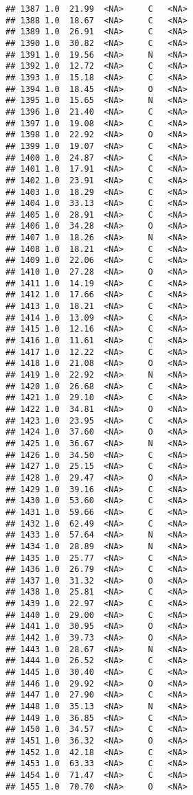 \documentclass[
]{article}
\begin{document}
\begin{verbatim}
## 1387 1.0  21.99  <NA>     C   <NA>
## 1388 1.0  18.67  <NA>     C   <NA>
## 1389 1.0  26.91  <NA>     C   <NA>
## 1390 1.0  30.82  <NA>     C   <NA>
## 1391 1.0  19.56  <NA>     N   <NA>
## 1392 1.0  12.72  <NA>     C   <NA>
## 1393 1.0  15.18  <NA>     C   <NA>
## 1394 1.0  18.45  <NA>     O   <NA>
## 1395 1.0  15.65  <NA>     N   <NA>
## 1396 1.0  21.40  <NA>     C   <NA>
## 1397 1.0  19.08  <NA>     C   <NA>
## 1398 1.0  22.92  <NA>     O   <NA>
## 1399 1.0  19.07  <NA>     C   <NA>
## 1400 1.0  24.87  <NA>     C   <NA>
## 1401 1.0  17.91  <NA>     C   <NA>
## 1402 1.0  23.91  <NA>     C   <NA>
## 1403 1.0  18.29  <NA>     C   <NA>
## 1404 1.0  33.13  <NA>     C   <NA>
## 1405 1.0  28.91  <NA>     C   <NA>
## 1406 1.0  34.28  <NA>     O   <NA>
## 1407 1.0  18.26  <NA>     N   <NA>
## 1408 1.0  18.21  <NA>     C   <NA>
## 1409 1.0  22.06  <NA>     C   <NA>
## 1410 1.0  27.28  <NA>     O   <NA>
## 1411 1.0  14.19  <NA>     C   <NA>
## 1412 1.0  17.66  <NA>     C   <NA>
## 1413 1.0  18.21  <NA>     C   <NA>
## 1414 1.0  13.09  <NA>     C   <NA>
## 1415 1.0  12.16  <NA>     C   <NA>
## 1416 1.0  11.61  <NA>     C   <NA>
## 1417 1.0  12.22  <NA>     C   <NA>
## 1418 1.0  21.08  <NA>     O   <NA>
## 1419 1.0  22.92  <NA>     N   <NA>
## 1420 1.0  26.68  <NA>     C   <NA>
## 1421 1.0  29.10  <NA>     C   <NA>
## 1422 1.0  34.81  <NA>     O   <NA>
## 1423 1.0  23.95  <NA>     C   <NA>
## 1424 1.0  37.60  <NA>     O   <NA>
## 1425 1.0  36.67  <NA>     N   <NA>
## 1426 1.0  34.50  <NA>     C   <NA>
## 1427 1.0  25.15  <NA>     C   <NA>
## 1428 1.0  29.47  <NA>     O   <NA>
## 1429 1.0  39.16  <NA>     C   <NA>
## 1430 1.0  53.60  <NA>     C   <NA>
## 1431 1.0  59.66  <NA>     C   <NA>
## 1432 1.0  62.49  <NA>     C   <NA>
## 1433 1.0  57.64  <NA>     N   <NA>
## 1434 1.0  28.89  <NA>     N   <NA>
## 1435 1.0  25.77  <NA>     C   <NA>
## 1436 1.0  26.79  <NA>     C   <NA>
## 1437 1.0  31.32  <NA>     O   <NA>
## 1438 1.0  25.81  <NA>     C   <NA>
## 1439 1.0  22.97  <NA>     C   <NA>
## 1440 1.0  29.00  <NA>     C   <NA>
## 1441 1.0  30.95  <NA>     O   <NA>
## 1442 1.0  39.73  <NA>     O   <NA>
## 1443 1.0  28.67  <NA>     N   <NA>
## 1444 1.0  26.52  <NA>     C   <NA>
## 1445 1.0  30.40  <NA>     C   <NA>
## 1446 1.0  29.92  <NA>     O   <NA>
## 1447 1.0  27.90  <NA>     C   <NA>
## 1448 1.0  35.13  <NA>     N   <NA>
## 1449 1.0  36.85  <NA>     C   <NA>
## 1450 1.0  34.57  <NA>     C   <NA>
## 1451 1.0  36.32  <NA>     O   <NA>
## 1452 1.0  42.18  <NA>     C   <NA>
## 1453 1.0  63.33  <NA>     C   <NA>
## 1454 1.0  71.47  <NA>     C   <NA>
## 1455 1.0  70.70  <NA>     O   <NA>

\end{verbatim}
\end{document}
